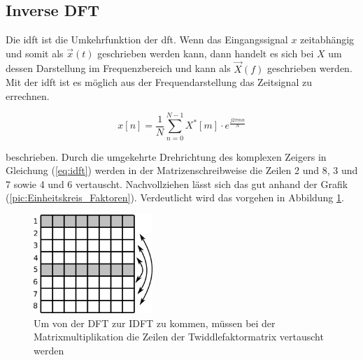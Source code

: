 \subsection{Inverse DFT}

Die \gls{idft} ist die Umkehrfunktion der \gls{dft}. Wenn das Eingangssignal $x$ zeitabhängig und somit als $\vec{x}(t)$ geschrieben werden kann, dann handelt es sich bei $X$ um
dessen Darstellung im Frequenzbereich und kann als $\vec{X}(f)$ geschrieben werden. Mit der \gls{idft} ist es möglich aus der Frequendarstellung das Zeitsignal zu errechnen.

\begin{equation}\label{eq:idft}
 x \left[ n \right] = \frac{1}{N} \sum^{N-1}_{n=0} X^*[m] \cdot e^{\frac{j 2 \pi m n}{N}}
\end{equation}

beschrieben. Durch die umgekehrte Drehrichtung des komplexen Zeigers in Gleichung (\ref{eq:idft}) werden in der Matrizenschreibweise die Zeilen 2 und 8, 3 und 7 sowie 4 und 6 vertauscht.
Nachvollziehen lässt sich das gut anhand der Grafik (\ref{pic:Einheitskreis_Faktoren}). 
Verdeutlicht wird das vorgehen in Abbildung \ref{pic:IDFT_Zeilentausch}.

\begin{figure}[ht]
 \centering
 \includegraphics[width=0.4\textwidth]{img/IDFT_Zeilentausch.png}
 \caption{Um von der DFT zur IDFT zu kommen, müssen bei der Matrixmultiplikation die Zeilen der Twiddlefaktormatrix vertauscht werden}
 \label{pic:IDFT_Zeilentausch}
\end{figure}

